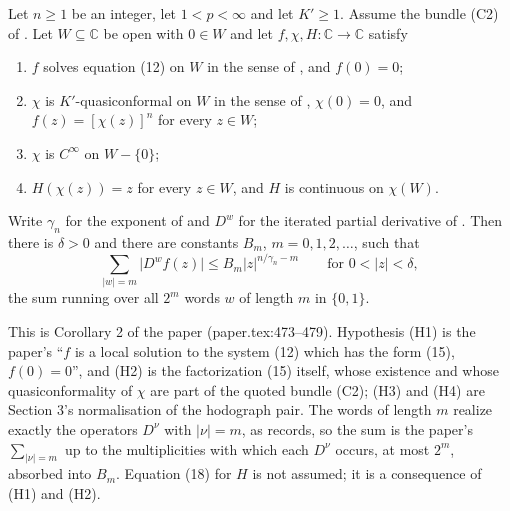 \begin{corollary}
Let $n\ge1$ be an integer, let $1<p<\infty$ and let $K'\ge1$.  Assume the
bundle (C2) of .  Let $W\subseteq\mathbb{C}$ be open with
$0\in W$ and let $f,\chi,H\colon\mathbb{C}\to\mathbb{C}$ satisfy
\begin{enumerate}
\item[(H1)] $f$ solves equation (12) on $W$ in the sense of
  , and $f(0)=0$;
\item[(H2)] $\chi$ is $K'$-quasiconformal on $W$ in the sense of
  , $\chi(0)=0$, and $f(z)=[\chi(z)]^{n}$ for every
  $z\in W$;
\item[(H3)] $\chi$ is $C^\infty$ on $W-\{0\}$;
\item[(H4)] $H(\chi(z))=z$ for every $z\in W$, and $H$ is continuous on
  $\chi(W)$.
\end{enumerate}
Write $\gamma_n$ for the exponent of  and $D^{w}$ for the
iterated partial derivative of .  Then there is $\delta>0$
and there are constants $B_m$, $m=0,1,2,\dots$, such that
\begin{equation}\tag{48}
  \sum_{|w|=m}\bigl|D^{w}f(z)\bigr|\le B_m|z|^{n/\gamma_n-m}
  \qquad\text{for }0<|z|<\delta,
\end{equation}
the sum running over all $2^m$ words $w$ of length $m$ in $\{0,1\}$.

This is Corollary 2 of the paper (paper.tex:473--479).  Hypothesis (H1) is the
paper's ``$f$ is a local solution to the system (12) which has the form (15),
$f(0)=0$'', and (H2) is the factorization (15) itself, whose existence and
whose quasiconformality of $\chi$ are part of the quoted bundle (C2); (H3) and
(H4) are Section 3's normalisation of the hodograph pair.  The words of length
$m$ realize exactly the operators $D^\nu$ with $|\nu|=m$, as
 records, so the sum is the paper's $\sum_{|\nu|=m}$ up to
the multiplicities with which each $D^\nu$ occurs, at most $2^m$, absorbed into
$B_m$.  Equation (18) for $H$ is not assumed; it is a consequence of (H1) and
(H2).
\end{corollary}
